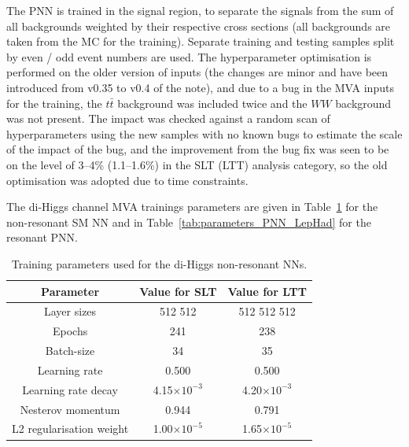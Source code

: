 The PNN is trained in the signal region, to separate the signals from the sum of all backgrounds weighted by their respective cross sections (all backgrounds are 
taken from the MC for the training). Separate training and testing samples split by even / odd event numbers are used. The hyperparameter optimisation is 
performed on the older version of inputs (the changes are minor and have been introduced from v0.35 to v0.4 of the note), and due to a bug in the MVA inputs for 
the training, the $t\bar t$ background was included twice and the $WW$ background was not present. The impact was checked against a random scan of 
hyperparameters using the new samples with no known bugs to estimate the scale of the impact of the bug, and the improvement from the bug fix was seen to be 
on the level of 3--4\% (1.1--1.6\%) in the SLT (LTT) analysis category, so the old optimisation was adopted due to time constraints.

The di-Higgs \lephad channel MVA trainings parameters are given in Table~\ref{tab:parameters_NN_LepHad} for the non-resonant SM NN and in Table~\ref{tab:parameters_PNN_LepHad} for the resonant PNN.

\begin{table}
  \centering
  \small
  \begin{tabular}{|c|c|c|}
    \hline
    Parameter & Value for SLT & Value for LTT\\
    \hline
    Layer sizes & 512 512 & 512 512 512\\
    Epochs & 241 & 238\\
    Batch-size & 34 & 35\\
    Learning rate & 0.500 & 0.500\\
    Learning rate decay & 4.15$\times 10^{-3}$ & 4.20$\times 10^{-3}$\\
    Nesterov momentum & 0.944 & 0.791\\
    L2 regularisation weight & 1.00$\times 10^{-5}$ & 1.65$\times 10^{-5}$\\
    \hline
  \end{tabular}
  \caption{Training parameters used for the di-Higgs \lephad non-resonant NNs.}
  \label{tab:parameters_NN_LepHad}
\end{table}

